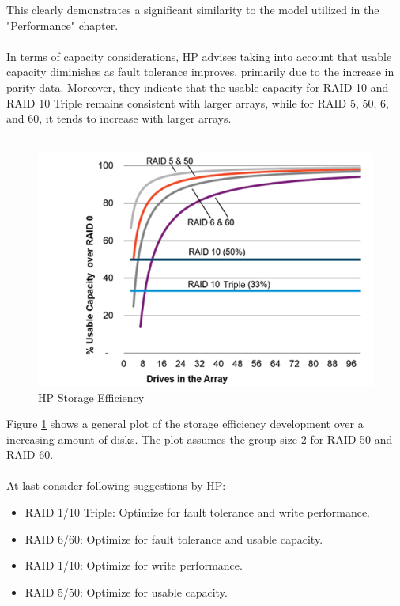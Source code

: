\documentclass{article}
\begin{document}
This clearly demonstrates a significant similarity to the model utilized in the "Performance" chapter.
\\ \\
In terms of capacity considerations, HP advises taking into account that usable capacity diminishes
as fault tolerance improves, primarily due to the increase in parity data.
Moreover, they indicate that the usable capacity for RAID 10 and RAID 10 Triple remains consistent with larger arrays,
while for RAID 5, 50, 6, and 60, it tends to increase with larger arrays. \cite{hpe:sa-userguide}
\\ \\
\begin{figure}
    \label{fig:hp-storage-efficiency}
    \includegraphics[width=\textwidth]{hp-storage-efficiency}
    \caption{HP Storage Efficiency \cite{hpe:sa-userguide}}
\end{figure}
Figure \ref{fig:hp-storage-efficiency} shows a general plot of the storage efficiency development
over a increasing amount of disks. The plot assumes the group size 2 for RAID-50 and RAID-60. \cite{hpe:sa-userguide}
\\ \\
At last consider following suggestions by HP:
\begin{itemize}
    \item RAID 1/10 Triple: Optimize for fault tolerance and write performance.
    \item RAID 6/60: Optimize for fault tolerance and usable capacity.
    \item RAID 1/10: Optimize for write performance.
    \item RAID 5/50: Optimize for usable capacity.
\end{itemize}
\end{document}
